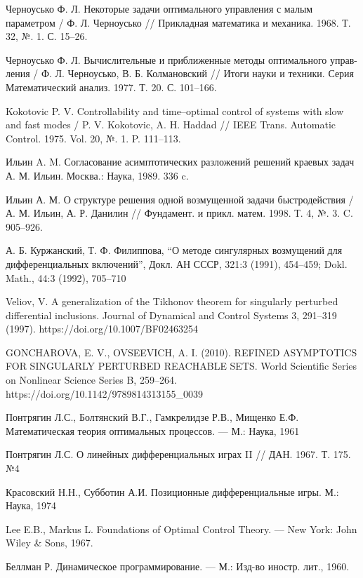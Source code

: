 \documentclass[../main.tex]{subfiles}
\begin{document}
\begin{thebibliography}{99}
Черноусько Ф. Л. Некоторые задачи оптимального управления с малым параметром / Ф. Л. Черноусько // Прикладная математика и механика.  1968.  Т. 32, №. 1.  С. 15–26.

Черноусько Ф. Л. Вычислительные и приближенные методы оптимального управ-ления / Ф. Л. Черноусько, В. Б. Колмановский // Итоги науки и техники. Серия Математический анализ. 1977.  Т. 20.  С. 101–166.

Kokotovic P. V. Controllability and time–optimal control of systems with slow and fast modes / P. V. Kokotovic, A. H. Haddad // IEEE Trans. Automatic Control. 
1975.  Vol. 20, №. 1.  P. 111–113.

Ильин A. M. Согласование асимптотических разложений решений краевых задач А. М. Ильин.  Москва.: Наука, 1989.  336 c.

Ильин А. М. О структуре решения одной возмущенной задачи быстродействия /А. М. Ильин, А. Р. Данилин // Фундамент. и прикл. матем. 1998. Т. 4, №. 3. C. 905–926.

А. Б. Куржанский, Т. Ф. Филиппова, “О методе сингулярных возмущений для дифференциальных включений”, Докл. АН СССР, 321:3 (1991), 454–459; Dokl. Math., 44:3 (1992), 705–710

Veliov, V. A generalization of the Tikhonov theorem for singularly perturbed differential inclusions. Journal of Dynamical and Control Systems 3, 291–319 (1997). https://doi.org/10.1007/BF02463254

GONCHAROVA, E. V.,  OVSEEVICH, A. I. (2010). REFINED ASYMPTOTICS FOR SINGULARLY PERTURBED REACHABLE SETS. World Scientific Series on Nonlinear Science Series B, 259–264. https://doi.org/10.1142/9789814313155\_0039

Понтрягин Л.С., Болтянский В.Г., Гамкрелидзе Р.В., Мищенко Е.Ф. Математическая теория оптимальных процессов. — М.: Наука, 1961

Понтрягин Л.С. О линейных дифференциальных играх II // ДАН. 1967. Т. 175. №4

Красовский Н.Н., Субботин А.И. Позиционные дифференциальные игры. М.: Наука, 1974

Lee E.B., Markus L. Foundations of Optimal Control Theory. — New York: John Wiley \& Sons, 1967.

Беллман Р. Динамическое программирование. — М.: Изд-во иностр. лит., 1960.


\end{thebibliography}
\end{document}
